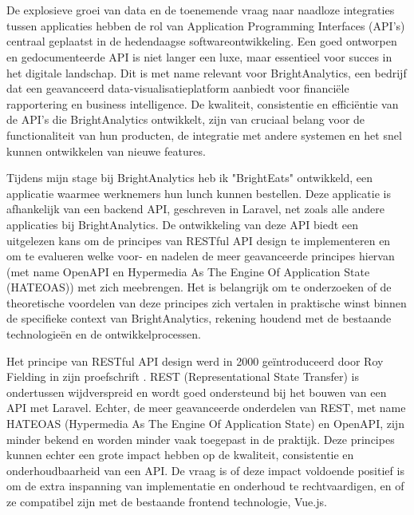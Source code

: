 
\chapter{}%
\label{ch:inleiding}

De explosieve groei van data en de toenemende vraag naar naadloze integraties tussen applicaties hebben de rol van Application Programming Interfaces (API's) centraal geplaatst in de hedendaagse softwareontwikkeling. Een goed ontworpen en gedocumenteerde API is niet langer een luxe, maar essentieel voor succes in het digitale landschap. Dit is met name relevant voor BrightAnalytics, een bedrijf dat een geavanceerd data-visualisatieplatform aanbiedt voor financiële rapportering en business intelligence. De kwaliteit, consistentie en efficiëntie van de API's die BrightAnalytics ontwikkelt, zijn van cruciaal belang voor de functionaliteit van hun producten, de integratie met andere systemen en het snel kunnen ontwikkelen van nieuwe features.

\bigskip

Tijdens mijn stage bij BrightAnalytics heb ik "BrightEats" ontwikkeld, een applicatie waarmee werknemers hun lunch kunnen bestellen. Deze applicatie is afhankelijk van een backend API, geschreven in Laravel, net zoals alle andere applicaties bij BrightAnalytics. De ontwikkeling van deze API biedt een uitgelezen kans om de principes van RESTful API design te implementeren en om te evalueren welke voor- en nadelen de meer geavanceerde principes hiervan (met name OpenAPI en Hypermedia As The Engine Of Application State (HATEOAS)) met zich meebrengen. Het is belangrijk om te onderzoeken of de theoretische voordelen van deze principes zich vertalen in praktische winst binnen de specifieke context van BrightAnalytics, rekening houdend met de bestaande technologieën en de ontwikkelprocessen.

\bigskip

Het principe van RESTful API design werd in 2000 geïntroduceerd door Roy Fielding in zijn proefschrift \autocite{Fielding2000}. REST (Representational State Transfer) is ondertussen wijdverspreid en wordt goed ondersteund bij het bouwen van een API met Laravel. Echter, de meer geavanceerde onderdelen van REST, met name HATEOAS (Hypermedia As The Engine Of Application State) en OpenAPI, zijn minder bekend en worden minder vaak toegepast in de praktijk. Deze principes kunnen echter een grote impact hebben op de kwaliteit, consistentie en onderhoudbaarheid van een API. De vraag is of deze impact voldoende positief is om de extra inspanning van implementatie en onderhoud te rechtvaardigen, en of ze compatibel zijn met de bestaande frontend technologie, Vue.js.

